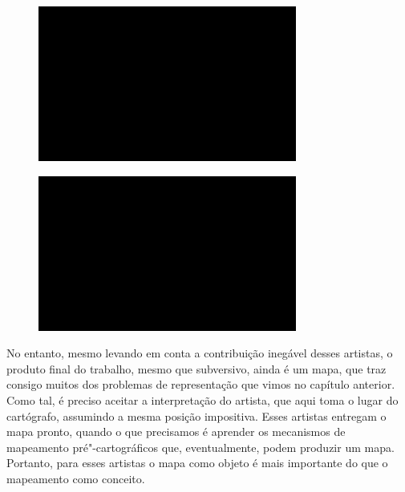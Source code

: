\begin{figure}[!ht]
\centering
 \includegraphics[width=85mm]{./imgs/im1.jpg}
\caption{\tiny{}}
\end{figure}

\begin{figure}[!ht]
\centering
 \includegraphics[width=85mm]{./imgs/im1.jpg}
\caption{\tiny{}}
\end{figure}

No entanto, mesmo levando em conta a contribuição inegável desses
artistas, o produto final do trabalho, mesmo que subversivo, ainda é um
mapa, que traz consigo muitos dos problemas de representação que vimos
no capítulo anterior. Como tal, é preciso aceitar a interpretação do
artista, que aqui toma o lugar do cartógrafo, assumindo a mesma posição
impositiva. Esses artistas entregam o mapa pronto, quando o que
precisamos é aprender os mecanismos de mapeamento pré"-cartográficos que,
eventualmente, podem produzir um mapa. Portanto, para esses artistas o
mapa como objeto é mais importante do que o mapeamento como conceito.

